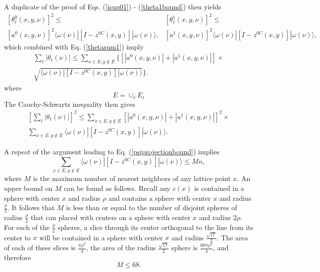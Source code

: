 \documentclass[twocolumn,amsmath,amssymb]{revtex4-1}
\begin{document}
A duplicate of the proof of Eqs. (\ref{isup01}) - (\ref{theta1bound}) then yields
\begin{subequations}
\begin{multline}
\label{theta0boundr}
[\theta^0_{\ell}(x,y,\nu)]^2 \le \\ [a^0(x,y,\nu)]^2  \langle  \omega(\nu)|[I - z^{0C}(x,y)]|\omega(\nu) \rangle ,
\end{multline}
\begin{multline}
\label{theta1boundr}
[\theta^1_{\ell}(x,y,\nu)]^2 \le \\ [a^1(x,y,\nu)]^2  \langle  \omega(\nu)|[I - z^{0C}(x,y)]|\omega(\nu) \rangle ,
\end{multline}
\end{subequations}
which combined with Eq. (\ref{thetasum1}) imply
\begin{multline}
\label{thetafinal1}
\sum_{\ell} |\theta_{\ell}(\nu)| \le 
\sum_{x \in E, y \notin E}  \{ [|a^0(x,y,\nu)| + |a^1(x,y,\nu)|] \times
\\ \sqrt{  \langle \omega(\nu)| [I - z^{0C}(x,y)]|\omega(\nu) \rangle } \}.
\end{multline}
where
\begin{equation}
  \label{defe}
  E = \cup_{\ell} E_\ell
\end{equation}
The Cauchy-Schwartz inequality then gives
\begin{multline}
\label{thetafinal2}
[\sum_{\ell} |\theta_{\ell}(\nu)|] ^ 2 \le
\sum_{x \in E, y \notin E} [|a^0(x,y,\nu)| + |a^1(x,y,\nu)|]^2 \times
\\ \sum_{x \in E, y \notin E}  \langle \omega(\nu)| [I - z^{0C}(x,y)]|\omega(\nu) \rangle .
\end{multline}

A repeat of the argument leading to Eq. (\ref{psiprojectionbound}) implies
\begin{equation}
  \label{psiprojectionbound1}
\sum_{x \in E, y \notin E}  \langle \omega(\nu)| [I - z^{0C}(x,y)]|\omega(\nu) \rangle  \le Mn,
\end{equation}
where $M$ is the maximum number of nearest neighbors of any lattice point $x$.
An upper bound on $M$ can be found as follows.
Recall any $c(x)$ is contained in a sphere with center $x$ and radius $\rho$
and contains a sphere with center $x$ and radius $\frac{\rho}{2}$. It follows
that $M$ is less than or equal to the number of disjoint spheres of radius $\frac{\rho}{2}$ that
can placed with centers on a sphere with center $x$ and radius $2 \rho$. For each of the $\frac{\rho}{2}$
spheres, a slice through its center orthogonal to the line from its center to $x$ 
will be contained in a sphere with center $x$ and radius $\frac{\sqrt{17}}{2}$.
The area of each of these slices is $\frac{\pi \rho^2}{4}$,
the area of the radius $\frac{\sqrt{17}}{2}$
sphere is $\frac{68 \pi \rho^2}{4}$, and therefore
\begin{equation}
  \label{boundonm}
  M \le 68.
\end{equation}
\end{document}
